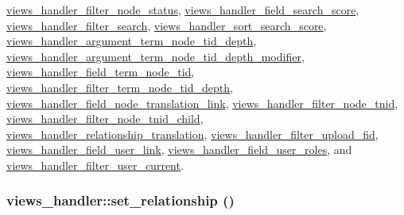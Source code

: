 \hyperlink{classviews__handler__filter__node__status_4f5351bb3567b5fe8bca111ffca83690}{views\_\-handler\_\-filter\_\-node\_\-status}, \hyperlink{classviews__handler__field__search__score_fda75fb726345ee91401d2f79ad2d313}{views\_\-handler\_\-field\_\-search\_\-score}, \hyperlink{classviews__handler__filter__search_f972f15bdc716b36d04d9a9d4f20b6f5}{views\_\-handler\_\-filter\_\-search}, \hyperlink{classviews__handler__sort__search__score_7d144db57e043dc594021228f8567726}{views\_\-handler\_\-sort\_\-search\_\-score}, \hyperlink{classviews__handler__argument__term__node__tid__depth_8956dffc5b8c1b5adef8cdc6e897c7ab}{views\_\-handler\_\-argument\_\-term\_\-node\_\-tid\_\-depth}, \hyperlink{classviews__handler__argument__term__node__tid__depth__modifier_13fb3ff5466a1c9fcd863bb4962a18c8}{views\_\-handler\_\-argument\_\-term\_\-node\_\-tid\_\-depth\_\-modifier}, \hyperlink{classviews__handler__field__term__node__tid_8160a16d41604b141768dc313b6223b9}{views\_\-handler\_\-field\_\-term\_\-node\_\-tid}, \hyperlink{classviews__handler__filter__term__node__tid__depth_ff1d2c0057597790a56bffd0674f391a}{views\_\-handler\_\-filter\_\-term\_\-node\_\-tid\_\-depth}, \hyperlink{classviews__handler__field__node__translation__link_ccd7784b851085dadf55b773f1845097}{views\_\-handler\_\-field\_\-node\_\-translation\_\-link}, \hyperlink{classviews__handler__filter__node__tnid_7e51dd45867a8a4a3c965a09d0ecd3b6}{views\_\-handler\_\-filter\_\-node\_\-tnid}, \hyperlink{classviews__handler__filter__node__tnid__child_a21b64d11f0f79a113be65b65e6249e0}{views\_\-handler\_\-filter\_\-node\_\-tnid\_\-child}, \hyperlink{classviews__handler__relationship__translation_f1e8ba159a9b04199ff03cad304ca1e4}{views\_\-handler\_\-relationship\_\-translation}, \hyperlink{classviews__handler__filter__upload__fid_84a251fda29d367d7c915b736fe43b46}{views\_\-handler\_\-filter\_\-upload\_\-fid}, \hyperlink{classviews__handler__field__user__link_b64eedee54360407b203c3d7474c40f2}{views\_\-handler\_\-field\_\-user\_\-link}, \hyperlink{classviews__handler__field__user__roles_26513786d88b63b1e2dcfd4aa09c4552}{views\_\-handler\_\-field\_\-user\_\-roles}, and \hyperlink{classviews__handler__filter__user__current_6002cf25d2385bd07c771f9a65cee48f}{views\_\-handler\_\-filter\_\-user\_\-current}.\hypertarget{classviews__handler_c54ea4553cbc678d23b51dfad3142a54}{
\subsubsection[{set\_\-relationship}]{\setlength{\rightskip}{0pt plus 5cm}views\_\-handler::set\_\-relationship ()}}
\label{classviews__handler_c54ea4553cbc678d23b51dfad3142a54}


